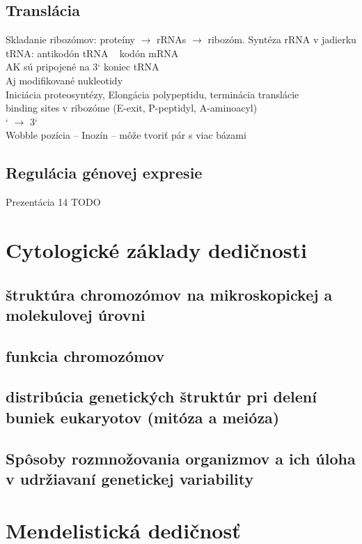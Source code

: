 \subsection{Translácia}
\tab Skladanie ribozómov: proteíny $\rightarrow$ rRNAs $\rightarrow$ ribozóm. Syntéza rRNA v jadierku\\
\tab tRNA: \tab antikodón tRNA ~ kodón mRNA\\
\tab \tab AK sú pripojené na 3` koniec tRNA\\
\tab \tab Aj modifikované nukleotidy\\
\tab \tab Iniciácia proteosyntézy, Elongácia polypeptidu, terminácia translácie\\
 binding sites v ribozóme (E-exit, P-peptidyl, A-aminoacyl)\\
` $\rightarrow$ 3`\\
\tab Wobble pozícia -- Inozín -- môže tvoriť pár s viac bázami\\
\subsection{Regulácia génovej expresie}
\tab Prezentácia 14 TODO\\

\section{Cytologické základy dedičnosti}
\subsection{štruktúra chromozómov na mikroskopickej a molekulovej úrovni}
\subsection{funkcia chromozómov}
\subsection{distribúcia genetických štruktúr pri delení buniek eukaryotov (mitóza a meióza)}
\subsection{Spôsoby rozmnožovania organizmov a ich úloha v udržiavaní genetickej variability}

\section{Mendelistická dedičnosť}
